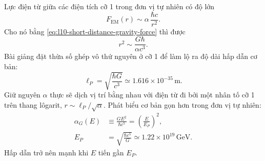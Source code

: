 Lực điện từ giữa các điện tích cỡ 1 trong đơn vị tự nhiên có độ lớn
\begin{equation}
  F_{\mathrm{EM}}(r)
  \sim
  \alpha\,\frac{\hbar c}{r^2}.
  \label{eq:l10-em-force-alpha}
\end{equation}
Cho nó bằng \eqref{eq:l10-short-distance-gravity-force} thì được
\begin{equation}
  r^2\sim\frac{G\hbar}{\alpha c^3}.
  \label{eq:l10-gravity-em-crossing}
\end{equation}
Bài giảng đặt thừa số ghép vô thứ nguyên ở cỡ 1 để làm lộ ra độ dài hấp dẫn cơ bản:
\begin{equation}
  \boxed{\ell_P=\sqrt{\frac{\hbar G}{c^3}}}
  \simeq1.616\times10^{-35}\,\mathrm{m}.
  \label{eq:l10-planck-length}
\end{equation}
Giữ nguyên \(\alpha\) thực sẽ dịch vị trí bằng nhau với điện từ đi bởi một nhân tố cỡ 1 trên thang lôgarit, \(r\sim\ell_P/\sqrt\alpha\). Phát biểu cơ bản gọn hơn trong đơn vị tự nhiên:
\begin{equation}
\begin{aligned}
  \alpha_G(E)
  &\equiv\frac{GE^2}{\hbar c^5}
  =\left(\frac{E}{E_P}\right)^2,
  \\
  E_P
  &=\sqrt{\frac{\hbar c^5}{G}}
  \simeq1.22\times10^{19}\,\mathrm{GeV}.
\end{aligned}
  \label{eq:l10-gravitational-coupling}
\end{equation}
Hấp dẫn trở nên mạnh khi \(E\) tiến gần \(E_P\).

\begin{classroomqa}
\end{classroomqa}

\begin{classroomqa}
\end{classroomqa}

